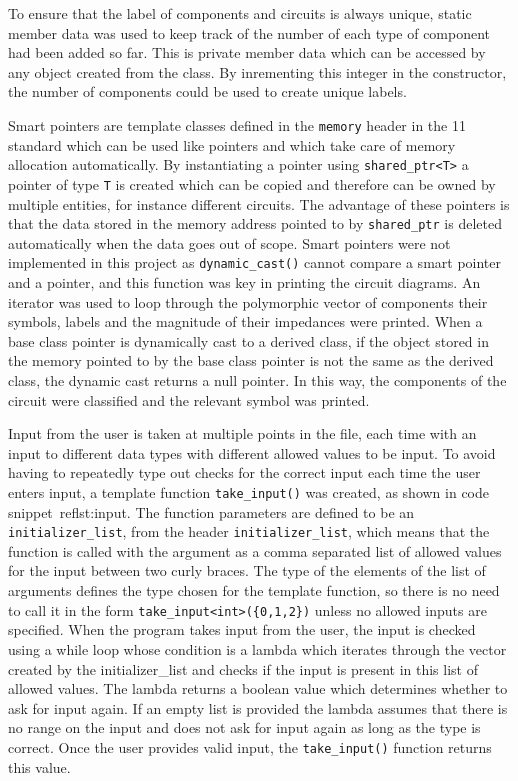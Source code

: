 To ensure that the label of components and circuits is always unique, static member data was used to keep track of the number of each type of component had been added so far. This is private member data which can be accessed by any object created from the class. By inrementing this integer in the constructor, the number of components could be used to create unique labels.

Smart pointers are template classes defined in the \verb!memory! header in the \CC{}11 standard which can be used like pointers and which take care of memory allocation automatically. By instantiating a pointer using \verb!shared_ptr<T>! a pointer of type \verb!T! is created which can be copied and therefore can be owned by multiple entities, for instance different circuits. The advantage of these pointers is that the data stored in the memory address pointed to by \verb!shared_ptr! is deleted automatically when the data goes out of scope. Smart pointers were not implemented in this project as \verb!dynamic_cast()! cannot compare a smart pointer and a pointer, and this function was key in printing the circuit diagrams. An iterator was used to loop through the polymorphic vector of components their symbols, labels and the magnitude of their impedances were printed. When a base class pointer is dynamically cast to a derived class, if the object stored in the memory pointed to by the base class pointer is not the same as the derived class, the dynamic cast returns a null pointer. In this way, the components of the circuit were classified and the relevant symbol was printed.

Input from the user is taken at multiple points in the file, each time with an input to different data types with different allowed values to be input. To avoid having to repeatedly type out checks for the correct input each time the user enters input, a template function \verb!take_input()! was created, as shown in code snippet~ref{lst:input}. The function parameters are defined to be an \verb!initializer_list!, from the header \verb!initializer_list!, which means that the function is called with the argument as a comma separated list of allowed values for the input between two curly braces. The type of the elements of the list of arguments defines the type chosen for the template function, so there is no need to call it in the form \verb!take_input<int>({0,1,2})! unless no allowed inputs are specified. When the program takes input from the user, the input is checked using a while loop whose condition is a lambda which iterates through the vector created by the initializer\_list and checks if the input is present in this list of allowed values.
The lambda returns a boolean value which determines whether to ask for input again.
If an empty list is provided the lambda assumes that there is no range on the input and does not ask for input again as long as the type is correct.
Once the user provides valid input, the \verb!take_input()! function returns this value.
